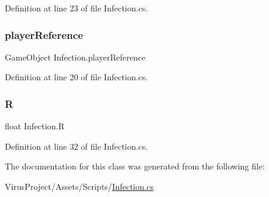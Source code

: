 Definition at line 23 of file Infection.\+cs.

\hypertarget{class_infection_aac370972b02543b0ad70b25840224f82}{}\label{class_infection_aac370972b02543b0ad70b25840224f82} 
\subsubsection{\texorpdfstring{player\+Reference}{playerReference}}
{\footnotesize\ttfamily Game\+Object Infection.\+player\+Reference}



Definition at line 20 of file Infection.\+cs.

\hypertarget{class_infection_ae45fa01c06fe42314a4846d713a436f4}{}\label{class_infection_ae45fa01c06fe42314a4846d713a436f4} 
\subsubsection{\texorpdfstring{R}{R}}
{\footnotesize\ttfamily float Infection.\+R}



Definition at line 32 of file Infection.\+cs.



The documentation for this class was generated from the following file\+:\begin{DoxyCompactItemize}
\item 
Virus\+Project/\+Assets/\+Scripts/\hyperlink{_infection_8cs}{Infection.\+cs}\end{DoxyCompactItemize}
